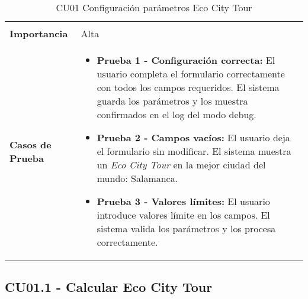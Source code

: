 \begin{table}[H]
\begin{tabularx}{\linewidth}{ p{} p{} }
\begin{itemize}
		\end{itemize}\\
		\textbf{Importancia}          & Alta \\
		\textbf{Casos de Prueba}      &
		\begin{itemize}
			\item \textbf{Prueba 1 - Configuración correcta:} El usuario completa el formulario correctamente con todos los campos requeridos. El sistema guarda los parámetros y los muestra confirmados en el log del modo debug.
			\vspace{2pt}
			\item \textbf{Prueba 2 - Campos vacíos:} El usuario deja el formulario sin modificar. El sistema muestra un \textit{Eco City Tour} en la mejor ciudad del mundo: Salamanca.
			\vspace{2pt}
			\item \textbf{Prueba 3 - Valores límites:} El usuario introduce valores límite en los campos. El sistema valida los parámetros y los procesa correctamente.
		\end{itemize} \\
		\bottomrule
	\end{tabularx}
	\caption{CU01 Configuración parámetros Eco City Tour}
	\label{cu:config-parametros}
\end{table}


\subsection{CU01.1 - Calcular Eco City Tour}

